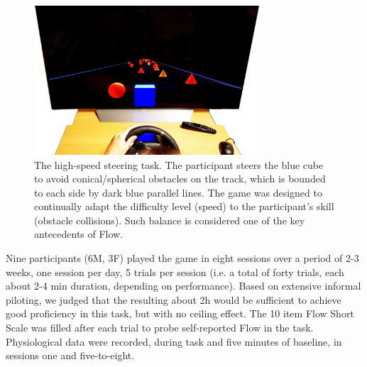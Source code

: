 \documentclass[fleqn,10pt]{wlscirep}
\newcommand{\nicewidth}{0.75\textwidth}
\begin{document}
\begin{figure}[!ht]
	\centering
	\includegraphics[width=\nicewidth]{Screenshot_cogcarsim}
	\caption{The high-speed steering task. The participant steers the blue cube to avoid conical/spherical obstacles on the track, which is bounded to each side by dark blue parallel lines. The game was designed to continually adapt the difficulty level (speed) to the participant's skill (obstacle collisions). Such balance is considered one of the key antecedents of Flow.}
	\label{fig:cogcarsim}
\end{figure}

Nine participants (6M, 3F) played the game in eight sessions over a period of 2-3 weeks, one session per day, 5 trials per session (i.e. a total of forty trials, each about 2-4 min duration, depending on performance). Based on extensive informal piloting, we judged that the resulting about 2h would be sufficient to achieve good proficiency in this task, but with no ceiling effect. The 10 item Flow Short Scale \cite{Engeser2008} was filled after each trial to probe self-reported Flow in the task. Physiological data were recorded, during task and five minutes of baseline, in sessions one and five-to-eight.
\end{document}
